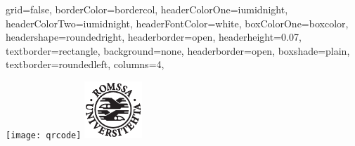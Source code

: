 \documentclass[fontscale=0.35,landscape,paperwidth=841mm,paperheight=1189mm]{baposter}  %
\begin{document}
	\setlength{\pdfpageheight}{\paperheight}
	\setlength{\pdfpagewidth}{\paperwidth}


	\begin{poster}{
		grid=false,
		borderColor=bordercol,
		headerColorOne=iumidnight,
		headerColorTwo=iumidnight,
		headerFontColor=white,
		boxColorOne=boxcolor,
		headershape=roundedright,
		headerborder=open,
		headerheight=0.07\textheight,
		textborder=rectangle,
		background=none,
		headerborder=open,
		boxshade=plain,
		textborder=roundedleft,
		columns=4,
	}{ %
		\setlength\fboxsep{0.5em}
		\setlength\fboxrule{0pt}
		\texttt{[image: qrcode]}
		\includegraphics[height=5.8em]{uitlogo}\hspace{1em}

}
\end{poster}
\end{document}
